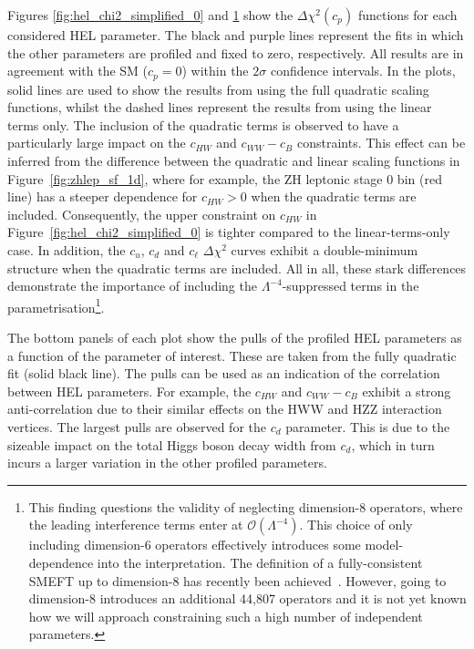 \begin{figure}
{  }
  \label{fig:hel_chi2_simplified_1}
\end{figure}

Figures \ref{fig:hel_chi2_simplified_0} and \ref{fig:hel_chi2_simplified_1} show the $\Delta\chi^2(c_p)$ functions for each considered HEL parameter. The black and purple lines represent the fits in which the other parameters are profiled and fixed to zero, respectively. All results are in agreement with the SM ($c_p=0$) within the $2\sigma$ confidence intervals. In the plots, solid lines are used to show the results from using the full quadratic scaling functions, whilst the dashed lines represent the results from using the linear terms only. The inclusion of the quadratic terms is observed to have a particularly large impact on the $c_{HW}$ and $c_{WW}-c_B$ constraints. This effect can be inferred from the difference between the quadratic and linear scaling functions in Figure~\ref{fig:zhlep_sf_1d}, where for example, the ZH leptonic stage 0 bin (red line) has a steeper dependence for $c_{HW}>0$ when the quadratic terms are included. Consequently, the upper constraint on $c_{HW}$ in Figure~\ref{fig:hel_chi2_simplified_0} is tighter compared to the linear-terms-only case. In addition, the $c_u$, $c_d$ and $c_{\ell}$ $\Delta\chi^2$ curves exhibit a double-minimum structure when the quadratic terms are included. All in all, these stark differences demonstrate the importance of including the $\Lambda^{-4}$-suppressed terms in the parametrisation\footnote{This finding questions the validity of neglecting dimension-8 operators, where the leading interference terms enter at $\mathcal{O}(\Lambda^{-4})$. This choice of only including dimension-6 operators effectively introduces some model-dependence into the interpretation. The definition of a fully-consistent SMEFT up to dimension-8 has recently been achieved~\cite{Murphy:2020rsh}. However, going to dimension-8 introduces an additional 44,807 operators and it is not yet known how we will approach constraining such a high number of independent parameters.}.

The bottom panels of each plot show the pulls of the profiled HEL parameters as a function of the parameter of interest. These are taken from the fully quadratic fit (solid black line). The pulls can be used as an indication of the correlation between HEL parameters. For example, the $c_{HW}$ and $c_{WW}-c_B$ exhibit a strong anti-correlation due to their similar effects on the HWW and HZZ interaction vertices. The largest pulls are observed for the $c_d$ parameter. This is due to the sizeable impact on the total Higgs boson decay width from $c_d$, which in turn incurs a larger variation in the other profiled parameters. 

